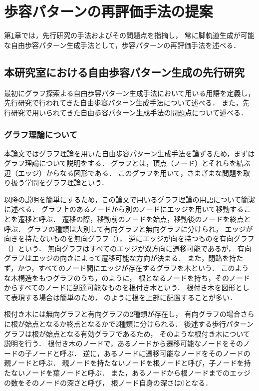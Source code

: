 ﻿


\chapter{歩容パターンの再評価手法の提案}\label{chapter:歩容パターンの再評価手法の提案}
第\ref{chapter:歩容パターンの再評価手法の提案}章では，先行研究の手法およびその問題点を指摘し，
常に脚軌道生成が可能な自由歩容パターン生成手法として，歩容パターンの再評価手法を述べる．

\section{本研究室における自由歩容パターン生成の先行研究}
最初にグラフ探索よる自由歩容パターン生成手法において用いる用語を定義し，
先行研究で行われてきた自由歩容パターン生成手法について述べる．
また，先行研究で用いられてきた自由歩容パターン生成手法の問題点について述べる．

\subsection{グラフ理論について}
本論文ではグラフ理論を用いた自由歩容パターン生成手法を論ずるため，まずはグラフ理論について説明をする．
グラフとは，頂点（ノード）とそれらを結ぶ辺（エッジ）からなる図形である．
このグラフを用いて，さまざまな問題を取り扱う学問をグラフ理論という．

以降の説明を簡単にするため，この論文で用いるグラフ理論の用語について簡潔に述べる．
グラフ上のあるノードから別のノードにエッジを用いて移動することを遷移と呼ぶ．
遷移の際，移動前のノードを始点，移動後のノードを終点と呼ぶ．
グラフの種類は大別して有向グラフと無向グラフに分けられ，
エッジが向きを持たないものを無向グラフ（），
逆にエッジが向を持つものを有向グラフ（）という．
無向グラフはすべてのエッジが双方向に遷移可能であるが，
有向グラフはエッジの向きによって遷移可能な方向が決まる．
また，閉路を持たず，かつ，すべてのノード間にエッジが存在するグラフを木という．
このような木構造をもつグラフのうち，のように，
根となるノードを持ち，そのノードからすべてのノードに到達可能なものを根付き木という．
根付き木を図形として表現する場合は簡単のため，
のように根を上部に配置することが多い．

根付き木には無向グラフと有向グラフの2種類が存在し，
有向グラフの場合さらに根が始点となるか終点となるかで2種類に分けられる．
後述する歩行パターングラフは根が始点となる有効グラフであるため，
そのような根付き木について説明を行う．
根付き木のノードで，あるノードから遷移可能なノードをそのノードの子ノードと呼ぶ．
逆に，あるノードに遷移可能なノードをそのノードの親ノードと呼ぶ．
親ノードを持たないノードを根ノードと呼び，子ノードを持たないノードを葉ノードと呼ぶ．
また，あるノードから根ノードまでのエッジの数をそのノードの深さと呼び，
根ノード自身の深さは0となる．

